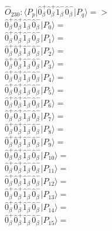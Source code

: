 \documentclass[14pt]{article}
\begin{document}
    $\hat{O}_{230}:  \langle{P_p}\vert \hat{0}_{\beta}^{+}\hat{0}_{\beta}^{+}\hat{1}_{\beta}^{-}\hat{0}_{\beta}^{-} \vert{P_q}\rangle => $ \\ 
    $ \hat{0}_{\beta}^{+}\hat{0}_{\beta}^{+}\hat{1}_{\beta}^{-}\hat{0}_{\beta}^{-} \vert{P_{0}}\rangle =  $ \\ 
    $ \hat{0}_{\beta}^{+}\hat{0}_{\beta}^{+}\hat{1}_{\beta}^{-}\hat{0}_{\beta}^{-} \vert{P_{1}}\rangle =  $ \\ 
    $ \hat{0}_{\beta}^{+}\hat{0}_{\beta}^{+}\hat{1}_{\beta}^{-}\hat{0}_{\beta}^{-} \vert{P_{2}}\rangle =  $ \\ 
    $ \hat{0}_{\beta}^{+}\hat{0}_{\beta}^{+}\hat{1}_{\beta}^{-}\hat{0}_{\beta}^{-} \vert{P_{3}}\rangle =  $ \\ 
    $ \hat{0}_{\beta}^{+}\hat{0}_{\beta}^{+}\hat{1}_{\beta}^{-}\hat{0}_{\beta}^{-} \vert{P_{4}}\rangle =  $ \\ 
    $ \hat{0}_{\beta}^{+}\hat{0}_{\beta}^{+}\hat{1}_{\beta}^{-}\hat{0}_{\beta}^{-} \vert{P_{5}}\rangle =  $ \\ 
    $ \hat{0}_{\beta}^{+}\hat{0}_{\beta}^{+}\hat{1}_{\beta}^{-}\hat{0}_{\beta}^{-} \vert{P_{6}}\rangle =  $ \\ 
    $ \hat{0}_{\beta}^{+}\hat{0}_{\beta}^{+}\hat{1}_{\beta}^{-}\hat{0}_{\beta}^{-} \vert{P_{7}}\rangle =  $ \\ 
    $ \hat{0}_{\beta}^{+}\hat{0}_{\beta}^{+}\hat{1}_{\beta}^{-}\hat{0}_{\beta}^{-} \vert{P_{8}}\rangle =  $ \\ 
    $ \hat{0}_{\beta}^{+}\hat{0}_{\beta}^{+}\hat{1}_{\beta}^{-}\hat{0}_{\beta}^{-} \vert{P_{9}}\rangle =  $ \\ 
    $ \hat{0}_{\beta}^{+}\hat{0}_{\beta}^{+}\hat{1}_{\beta}^{-}\hat{0}_{\beta}^{-} \vert{P_{10}}\rangle =  $ \\ 
    $ \hat{0}_{\beta}^{+}\hat{0}_{\beta}^{+}\hat{1}_{\beta}^{-}\hat{0}_{\beta}^{-} \vert{P_{11}}\rangle =  $ \\ 
    $ \hat{0}_{\beta}^{+}\hat{0}_{\beta}^{+}\hat{1}_{\beta}^{-}\hat{0}_{\beta}^{-} \vert{P_{12}}\rangle =  $ \\ 
    $ \hat{0}_{\beta}^{+}\hat{0}_{\beta}^{+}\hat{1}_{\beta}^{-}\hat{0}_{\beta}^{-} \vert{P_{13}}\rangle =  $ \\ 
    $ \hat{0}_{\beta}^{+}\hat{0}_{\beta}^{+}\hat{1}_{\beta}^{-}\hat{0}_{\beta}^{-} \vert{P_{14}}\rangle =  $ \\ 
    $ \hat{0}_{\beta}^{+}\hat{0}_{\beta}^{+}\hat{1}_{\beta}^{-}\hat{0}_{\beta}^{-} \vert{P_{15}}\rangle =  $ \\ 
    
\end{document}
